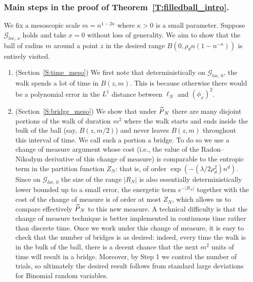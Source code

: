 \documentclass[10pt]{amsart}
\theoremstyle{definition}\newtheorem{defi}[theo]{Definition}\newtheorem{rema}[theo]{Remark}\newtheorem{exam}[theo]{Example}\newtheorem{exem}[theo]{Example}\newtheorem{nota}[theo]{Notation}
\newcommand{\cG}{\mathcal{G}}
\newcommand*{\romanenumi}{\renewcommand*{\theenumi}{\roman{enumi}}}
\let\oldtilde\tilde
\renewcommand*{\tilde}[1]{\mathchoice{\widetilde{#1}}{\widetilde{#1}}{\oldtilde{#1}}{\oldtilde{#1}}}\let\oldhat\hat
\renewcommand*{\hat}[1]{\mathchoice{\widehat{#1}}{\widehat{#1}}{\oldhat{#1}}{\oldhat{#1}}}\let\oldexists\exists
\renewcommand*{\exists}{\mathrel{\oldexists}}
\begin{document}
\subsubsection{Main steps in the proof of Theorem~\ref{T:filledball_intro}.}
We fix a mesoscopic scale $m = n^{1- 2\kappa}$ where $\kappa>0$ is a small parameter. Suppose $\cG_{loc,\,x}$ holds and take $x = 0$ without loss of generality. We aim to show that the ball of radius $m$ around a point $z$ in the desired range $B(0, \rho_d n (1- n^{ - \kappa}))$ is entirely visited.
\begin{enumerate}\romanenumi
\item \label{list.2.3.1.1}(Section~\ref{S:time_meso}) We first note that deterministically on $\cG_{loc,\,0}$, the walk spends a lot of time in $B(z, m)$. This is because otherwise there would be a polynomial error in the $L^1$ distance between $\ell_N$ and $(\phi_x)^2$.

\item \label{list.2.3.1.2} (Section~\ref{S:bridge_meso}) We show that under $\tilde P_N$ there are many disjoint portions of the walk of duration $m^2$ where the walk starts and ends inside the bulk of the ball (say, $B(z, m/2)$) and never leaves $B(z,m)$ throughout this interval of time. We call such a portion a bridge. To do so we use a change of measure argument whose cost (i.e., the value of the Radon--Nikodym derivative of this change of measure) is comparable to the entropic term in the partition function $Z_N$: that is, of order $\exp(- (\lambda /2 \rho_d^2) n^d)$. Since on $\cG_{loc,\,0}$ the size of the range $|R_N|$ is also essentially deterministically lower bounded up to a small error, the energetic term $e^{- |R_N|}$ together with the cost of the change of measure is of order at most $Z_N$, which allows us to compare effectively $\tilde P_N$ to this new measure. A technical difficulty is that the change of measure technique is better implemented in continuous time rather than discrete time. Once we work under this change of measure, it is easy to check that the number of bridges is as desired: indeed, every time the walk is in the bulk of the ball, there is a decent chance that the next $m^2$ units of time will result in a bridge. Moreover, by Step 1 we control the number of trials, so ultimately the desired result follows from standard large deviations for Binomial random variables.


\end{enumerate}
\end{document}
